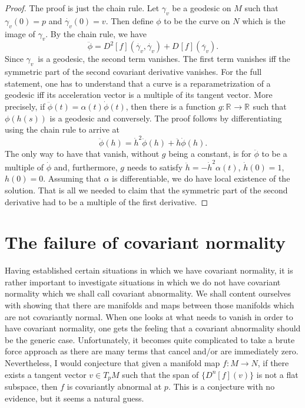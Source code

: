 \documentclass[11pt]{article}
\theoremstyle{remark}
\begin{document}
\begin{proof}
The proof is just the chain rule. Let $\ensuremath{\gamma_v}$ be a geodesic on $M$ such that
$\ensuremath{\gamma_v}(0) = p$ and $\ensuremath{{\overset{\cdot}{\gamma}}_{v}({0})} = v$. Then define $\phi$ to be the curve
on $N$ which is the image of $\ensuremath{\gamma_v}$. By the chain rule, we have
\[
\ddot{\phi} = \ensuremath{D^{2} [{f}] ({\dot{\ensuremath{\gamma_v}},\dot{\ensuremath{\gamma_v}}}) } + \ensuremath{D^{} [{f}] ({\ddot{\ensuremath{\gamma_v}}}) }.
\]
Since \ensuremath{\gamma_v}\ is a geodesic, the second term vanishes. The first term
vanishes iff the symmetric part of the second covariant derivative
vanishes. For the full statement, one has to understand that a curve
is a reparametrization of a geodesic iff its acceleration vector is a
multiple of its tangent vector. More precisely, if $\ddot{\phi} (t) =
\alpha(t) \dot{\phi}(t)$, then there is a function $g: \ensuremath{\mathbb{R}^{}} \to
\ensuremath{\mathbb{R}^{}}$ 
such that $\phi(h(s))$ is a geodesic and conversely. The proof follows by
differentiating using the chain rule to arrive at 
\[\ddot{\phi}(h) = \dot{h}^2 \ddot{\phi}(h) + \ddot{h} \dot{\phi}(h).
\]
The only way to have that vanish, without $g$ being a constant, is for
$\ddot{\phi}$ to be a multiple of $\dot{\phi}$ and, furthermore,  $g$
needs to satisfy
$\ddot{h} = - \dot{h}^2 \alpha(t)$, $\dot{h}(0) =1$, $h(0) =0$.
 Assuming that $\alpha$ is
differentiable, we do have local existence of the solution.  That is
all we needed to claim that the symmetric part of the second
 derivative had to be a multiple of the first derivative.
\end{proof}


\section{The failure of covariant normality}

Having established certain situations in which we have covariant
normality, it is rather important to investigate situations in which
we do not have covariant normality which we shall call covariant
abnormality. 
We shall content ourselves with
showing that there are manifolds and maps between those manifolds
which are not covariantly normal. When one looks at what needs to
vanish in order to have covariant normality, one gets the feeling that
a  covariant abnormality should be the generic case.
Unfortunately, it becomes quite complicated to take a brute force
approach  as 
there are many terms that  cancel and/or
are immediately zero. Nevertheless, I would conjecture that given a
manifold map $f : M \to N$, if there exists a tangent 
vector $v \in
T_pM$ such that the 
span of $\{D^n[f] (v)\}$ is not a flat subspace, then $f$ is 
covariantly abnormal at $p$. This is a conjecture with no evidence, but
it seems a natural guess. 
\end{document}
